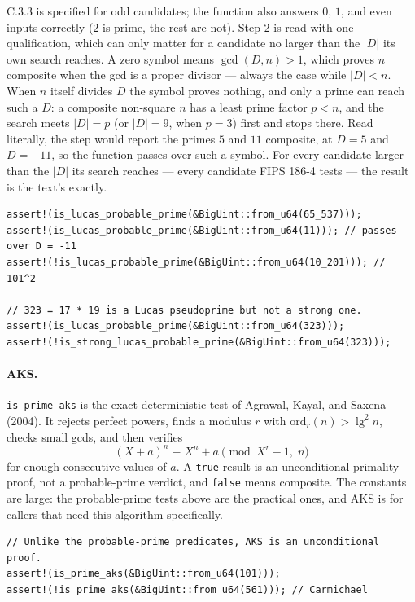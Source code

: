 \documentclass[11pt]{article}
\newcommand{\code}[1]{\texttt{#1}}
\begin{document}
C.3.3 is specified for odd candidates; the function also answers $0$, $1$,
and even inputs correctly ($2$ is prime, the rest are not). Step 2 is read
with one qualification, which can only matter for a candidate no larger
than the $|D|$ its own search reaches. A zero symbol means
$\gcd(D, n) > 1$, which proves $n$ composite when the gcd is a proper
divisor --- always the case while $|D| < n$. When $n$ itself divides $D$
the symbol proves nothing, and only a prime can reach such a $D$: a
composite non-square $n$ has a least prime factor $p < n$, and the search
meets $|D| = p$ (or $|D| = 9$, when $p = 3$) first and stops there. Read
literally, the step would report the primes $5$ and $11$ composite, at
$D = 5$ and $D = -11$, so the function passes over such a symbol. For
every candidate larger than the $|D|$ its search reaches --- every
candidate FIPS 186-4 tests --- the result is the text's exactly.

\begin{lstlisting}
assert!(is_lucas_probable_prime(&BigUint::from_u64(65_537)));
assert!(is_lucas_probable_prime(&BigUint::from_u64(11))); // passes over D = -11
assert!(!is_lucas_probable_prime(&BigUint::from_u64(10_201))); // 101^2

// 323 = 17 * 19 is a Lucas pseudoprime but not a strong one.
assert!(is_lucas_probable_prime(&BigUint::from_u64(323)));
assert!(!is_strong_lucas_probable_prime(&BigUint::from_u64(323)));
\end{lstlisting}

\paragraph{AKS.} \code{is\_prime\_aks} is the exact deterministic test of
Agrawal, Kayal, and Saxena (2004). It rejects perfect powers, finds a
modulus $r$ with $\mathrm{ord}_r(n) > \lg^2 n$, checks small gcds, and then
verifies
\begin{equation}
(X + a)^n \equiv X^n + a \pmod{X^r - 1,\; n}
\end{equation}
for enough consecutive values of $a$. A \code{true} result is an
unconditional primality proof, not a probable-prime verdict, and
\code{false} means composite. The constants are large: the probable-prime
tests above are the practical ones, and AKS is for callers that need this
algorithm specifically.

\begin{lstlisting}
// Unlike the probable-prime predicates, AKS is an unconditional proof.
assert!(is_prime_aks(&BigUint::from_u64(101)));
assert!(!is_prime_aks(&BigUint::from_u64(561))); // Carmichael
\end{lstlisting}
\end{document}
